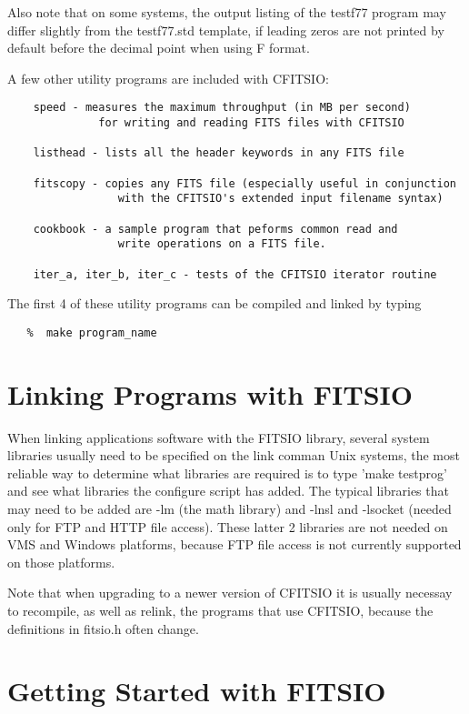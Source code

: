 \documentclass[11pt]{book}
\begin{document}
Also note that on some systems, the output listing of the testf77
program may differ slightly from the testf77.std template, if leading
zeros are not printed by default before the decimal point when using F
format.

A few other utility  programs are included with CFITSIO:

\begin{verbatim}
    speed - measures the maximum throughput (in MB per second)
              for writing and reading FITS files with CFITSIO

    listhead - lists all the header keywords in any FITS file

    fitscopy - copies any FITS file (especially useful in conjunction
                 with the CFITSIO's extended input filename syntax)

    cookbook - a sample program that peforms common read and
                 write operations on a FITS file.

    iter_a, iter_b, iter_c - tests of the CFITSIO iterator routine
\end{verbatim}

The first 4 of these utility programs can be compiled and linked by typing

\begin{verbatim}
   %  make program_name
\end{verbatim}


\section{Linking Programs with FITSIO}

When linking applications software with the FITSIO library, several system libraries usually need to be specified on the link comman
Unix systems, the most reliable way to determine what libraries are required
is to type 'make testprog' and see what libraries the configure script has
added.  The typical libraries that may need to be added are -lm (the math
library) and -lnsl and -lsocket (needed only for FTP and HTTP file access).
These latter 2 libraries are not needed on VMS and Windows platforms,
because FTP file access is not currently supported on those platforms.

Note that when upgrading to a newer version of CFITSIO it is usually
necessay to recompile, as well as relink, the programs that use CFITSIO,
because the definitions in fitsio.h often change.


\section{Getting Started with FITSIO}
\end{document}
